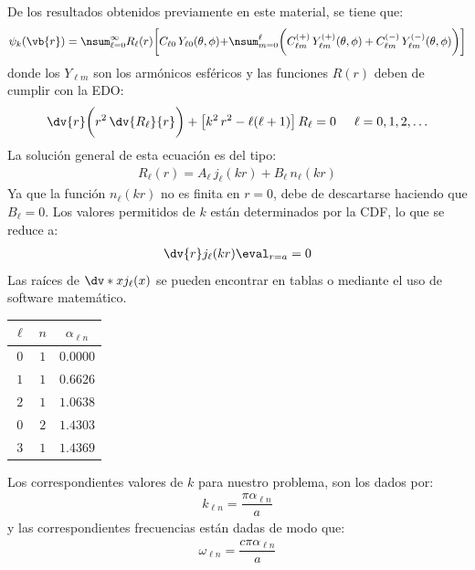 De los resultados obtenidos previamente en este material, se tiene que:
\begin{align*}
\psi_{k} (\vb{r}) = \nsum_{\ell=0}^{\infty} R_{\ell} (r) \bigg[ C_{\ell 0} \, Y_{\ell 0} (\theta, \phi) {+} \nsum_{m=0}^{\ell} \bigg( C_{\ell m}^{(+)} \, Y_{\ell m}^{(+)} (\theta, \phi) + C_{\ell m}^{(-)} \, Y_{\ell m}^{(-)} (\theta, \phi) \bigg) \bigg]
\end{align*}    
donde los $Y_{\ell m}$ son los armónicos esféricos y las funciones $R (r)$ deben de cumplir con la EDO:
\begin{align*}
\dv{r} \bigg( r^{2} \, \dv{R_{\ell}}{r} \bigg) + \big[ k^{2} \, r^{2} - \ell (\ell + 1) \big] \, R_{\ell} = 0 \hspace{0.5cm} \ell = 0, 1, 2, \ldots
\end{align*}
La solución general de esta ecuación es del tipo:
\begin{align*}
R_{\ell} (r) = A_{\ell} \, j_{\ell} (k r) + B_{\ell} \, n_{\ell} (k r) 
\end{align*}
Ya que la función $n_{\ell} (k r)$ no es finita en $r = 0$, debe de descartarse haciendo que $B_{\ell} = 0$. Los valores permitidos de $k$ están determinados por la CDF, lo que se reduce a:
\begin{align*}
\dv{r} j_{\ell} (k r) \eval_{r=a} = 0
\end{align*}
Las raíces de $\dv*{x} j_{\ell} (x)$ se pueden encontrar en tablas o mediante el uso de software matemático.
\begin{table}[H]
\centering
\large
\begin{tabular}{c c c}
$\ell$ & $n$ & $\alpha_{\ell n}$ \\ \hline
$0$ & $1$ & $0.0000$ \\ \hline
$1$ & $1$ & $0.6626$ \\ \hline
$2$ & $1$ & $1.0638$ \\ \hline
$0$ & $2$ & $1.4303$ \\ \hline
$3$ & $1$ & $1.4369$ \\ \hline
\end{tabular}
\end{table}
Los correspondientes valores de $k$ para nuestro problema, son los dados por:
\begin{align*}
k_{\ell n} = \dfrac{\pi \alpha_{\ell n}}{a}
\end{align*}
y las correspondientes frecuencias están dadas de modo que:
\begin{align*}
\omega_{\ell n} = \dfrac{c \pi \alpha_{\ell n}}{a}
\end{align*}
